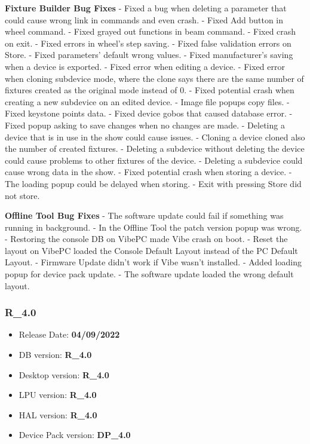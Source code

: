 \documentclass[
]{article}
\providecommand{\tightlist}{%
  \setlength{\itemsep}{0pt}\setlength{\parskip}{0pt}}
\begin{document}
\textbf{Fixture Builder Bug Fixes}
- Fixed a bug when deleting a parameter that could cause wrong link in commands and even crash.
- Fixed Add button in wheel command.
- Fixed grayed out functions in beam command.
- Fixed crash on exit.
- Fixed errors in wheel's step saving.
- Fixed false validation errors on Store.
- Fixed parameters' default wrong values.
- Fixed manufacturer's saving when a device is exported.
- Fixed error when editing a device.
- Fixed error when cloning subdevice mode, where the clone says there are the same number of fixtures created as the original mode instead of 0.
- Fixed potential crash when creating a new subdevice on an edited device.
- Image file popups copy files.
- Fixed keystone points data.
- Fixed device gobos that caused database error.
- Fixed popup asking to save changes when no changes are made.
- Deleting a device that is in use in the show could cause issues.
- Cloning a device cloned also the number of created fixtures.
- Deleting a subdevice without deleting the device could cause problems to other fixtures of the device.
- Deleting a subdevice could cause wrong data in the show.
- Fixed potential crash when storing a device.
- The loading popup could be delayed when storing.
- Exit with pressing Store did not store.

\textbf{Offline Tool Bug Fixes}
- The software update could fail if something was running in background.
- In the Offline Tool the patch version popup was wrong.
- Restoring the console DB on VibePC made Vibe crash on boot.
- Reset the layout on VibePC loaded the Console Default Layout instead of the PC Default Layout.
- Firmware Update didn't work if Vibe wasn't installed.
- Added loading popup for device pack update.
- The software update loaded the wrong default layout.

\hypertarget{r_4.0}{%
\subsubsection{R\_4.0}\label{r_4.0}}

\begin{itemize}
\tightlist
\item
  Release Date: \textbf{04/09/2022}
\item
  DB version: \textbf{R\_4.0}
\item
  Desktop version: \textbf{R\_4.0}
\item
  LPU version: \textbf{R\_4.0}
\item
  HAL version: \textbf{R\_4.0}
\item
  Device Pack version: \textbf{DP\_4.0}
\end{itemize}
\end{document}
